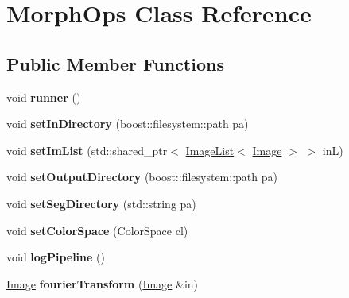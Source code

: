 \hypertarget{classMorphOps}{}\section{Morph\+Ops Class Reference}
\label{classMorphOps}
\subsection*{Public Member Functions}
\begin{DoxyCompactItemize}
\item 
void {\bfseries runner} ()\hypertarget{classMorphOps_a525552ba49d5d3fb5fd02f7be008a30c}{}\label{classMorphOps_a525552ba49d5d3fb5fd02f7be008a30c}

\item 
void {\bfseries set\+In\+Directory} (boost\+::filesystem\+::path pa)\hypertarget{classMorphOps_afbbc9b689e24e4161ab2ca54f806950b}{}\label{classMorphOps_afbbc9b689e24e4161ab2ca54f806950b}

\item 
void {\bfseries set\+Im\+List} (std\+::shared\+\_\+ptr$<$ \hyperlink{classImageList}{Image\+List}$<$ \hyperlink{classImage}{Image} $>$ $>$ inL)\hypertarget{classMorphOps_ae6090157a5acb5913ec4f716b537d644}{}\label{classMorphOps_ae6090157a5acb5913ec4f716b537d644}

\item 
void {\bfseries set\+Output\+Directory} (boost\+::filesystem\+::path pa)\hypertarget{classMorphOps_a2d5347a94e5f5fca9d78676501138f69}{}\label{classMorphOps_a2d5347a94e5f5fca9d78676501138f69}

\item 
void {\bfseries set\+Seg\+Directory} (std\+::string pa)\hypertarget{classMorphOps_ac8d816e9ab14af83095b8e8e2b5507e6}{}\label{classMorphOps_ac8d816e9ab14af83095b8e8e2b5507e6}

\item 
void {\bfseries set\+Color\+Space} (Color\+Space cl)\hypertarget{classMorphOps_a6e913dc39633faa5841f0b66d6b1e2c2}{}\label{classMorphOps_a6e913dc39633faa5841f0b66d6b1e2c2}

\item 
void {\bfseries log\+Pipeline} ()\hypertarget{classMorphOps_a54bc83f7f5a0db999f38c0df1ec117e2}{}\label{classMorphOps_a54bc83f7f5a0db999f38c0df1ec117e2}

\item 
\hyperlink{classImage}{Image} {\bfseries fourier\+Transform} (\hyperlink{classImage}{Image} \&in)\hypertarget{classMorphOps_aef2a2deb7a0abd8c89526ac46a208f94}{}\label{classMorphOps_aef2a2deb7a0abd8c89526ac46a208f94}


\end{DoxyCompactItemize}
